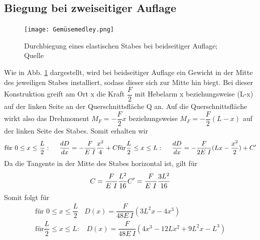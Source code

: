 \subsection{Biegung bei zweiseitiger Auflage}
    \begin{figure}
        \centering
        \texttt{[image: Gemüsemedley.png]}
        \caption{Durchbiegung eines elastischen Stabes bei beidseitiger Auflage; Quelle \cite{sample}}
        \label{fig:gemüse}
    \end{figure}
    Wie in Abb. \ref{fig:gemüse} dargestellt, wird bei beidseitiger Auflage ein Gewicht in der Mitte des 
    jeweiligen Stabes installiert, sodass dieser sich zur Mitte hin biegt. Bei dieser 
    Konstruktion greift am Ort x die Kraft $\dfrac{F}{2}$ mit Hebelarm x 
    beziehungsweise (L-x) auf der linken Seite an der Querschnittsfläche Q
    an. Auf die Querschnittsfläche wirkt also das Drehmoment $M_F = -\dfrac{F}{2} x$ 
    beziehungsweise $M_F = -\dfrac{F}{2}(L-x)$ auf der linken Seite des Stabes.
    Somit erhalten wir 
    \begin{equation}
        \text{für } 0 \leq x \leq \dfrac{L}{2}:\ \ \ \ \dfrac{d D}{dx}=-\dfrac{F}{E\ I}\dfrac{x^2}{4}+C \\
        \text{für} \dfrac{L}{2} \leq x \leq L:\ \ \ \ \dfrac{d D}{dx}=-\dfrac{F}{2 E\ I}(Lx - \dfrac{x^2}{2})+C'
    \end{equation}
    Da die Tangente in der Mitte des Stabes horizontal ist, gilt für 
    \begin{equation*}
        C = \dfrac{F}{E\ I}\dfrac{L^2}{16} \\
        C'=\dfrac{F}{E\ I}\dfrac{3L^2}{16}
    \end{equation*}
    Somit folgt für 
    \begin{align}
        \text{für } 0 \leq x \leq \dfrac{L}{2}\ \ \ \ D(x)=\dfrac{F}{48 E\ I}(3L^2x-4x^3) \label{eqn:kurt} \\
        \text{für} \dfrac{L}{2} \leq x \leq L:\ \ \ \ D(x)=\dfrac{F}{48 E\ I}(4 x^3-12Lx^2+9L^2x-L^3) \label{eqn:fred}
    \end{align}

